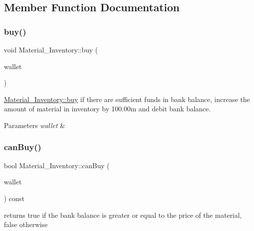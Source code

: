 \subsection{Member Function Documentation}
\mbox{\label{classMaterial__Inventory_a5be24d53377c58ea2391e0f872d199d8}} 
\subsubsection{\texorpdfstring{buy()}{buy()}}
{\footnotesize\ttfamily void Material\+\_\+\+Inventory\+::buy (\begin{DoxyParamCaption}\item[{\mbox{\hyperlink{classWallet}{Wallet}} \&}]{wallet }\end{DoxyParamCaption})}



\mbox{\hyperlink{classMaterial__Inventory_a5be24d53377c58ea2391e0f872d199d8}{Material\+\_\+\+Inventory\+::buy}} if there are sufficient funds in bank balance, increase the amount of material in inventory by 100.\+00m and debit bank balance. 


\begin{DoxyParams}{Parameters}
{\em wallet} & \\
\hline
\end{DoxyParams}
\mbox{\label{classMaterial__Inventory_abb1d889d0af7b79da3b5100a409a5140}} 
\subsubsection{\texorpdfstring{canBuy()}{canBuy()}}
{\footnotesize\ttfamily bool Material\+\_\+\+Inventory\+::can\+Buy (\begin{DoxyParamCaption}\item[{\mbox{\hyperlink{classWallet}{Wallet}} \&}]{wallet }\end{DoxyParamCaption}) const}

returns true if the bank balance is greater or equal to the price of the material, false otherwise \mbox{\label{classMaterial__Inventory_acce12bd627e92d35e9b3ba0272bfa124}} 
